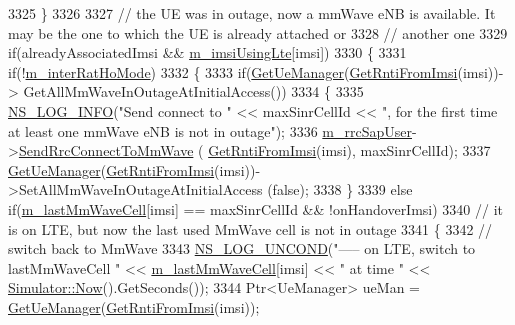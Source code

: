 \begin{DoxyCode}
3325   \}
3326 
3327   \textcolor{comment}{// the UE was in outage, now a mmWave eNB is available. It may be the one to which the UE is already
       attached or}
3328   \textcolor{comment}{// another one}
3329   \textcolor{keywordflow}{if}(alreadyAssociatedImsi && \hyperlink{classns3_1_1LteEnbRrc_a99427e888b10d095491e72bf062511db}{m\_imsiUsingLte}[imsi])
3330   \{
3331     \textcolor{keywordflow}{if}(!\hyperlink{classns3_1_1LteEnbRrc_a25849018e31a7766dfc839663e4c5ca4}{m\_interRatHoMode})
3332     \{
3333       \textcolor{keywordflow}{if}(\hyperlink{classns3_1_1LteEnbRrc_a875653948b565dc50b33f6a0434e32d9}{GetUeManager}(\hyperlink{classns3_1_1LteEnbRrc_a98f4b8f727e844ab621e447b7178ddc2}{GetRntiFromImsi}(imsi))->
      GetAllMmWaveInOutageAtInitialAccess())
3334       \{
3335         \hyperlink{group__logging_gafbd73ee2cf9f26b319f49086d8e860fb}{NS\_LOG\_INFO}(\textcolor{stringliteral}{"Send connect to "} << maxSinrCellId << \textcolor{stringliteral}{", for the first time at least one
       mmWave eNB is not in outage"});
3336         \hyperlink{classns3_1_1LteEnbRrc_a7bbf35518d70915fcd24d68a835fe6af}{m\_rrcSapUser}->\hyperlink{classns3_1_1LteEnbRrcSapUser_aee87f06442e7688b7d81fab229857ed4}{SendRrcConnectToMmWave} (
      \hyperlink{classns3_1_1LteEnbRrc_a98f4b8f727e844ab621e447b7178ddc2}{GetRntiFromImsi}(imsi), maxSinrCellId);
3337         \hyperlink{classns3_1_1LteEnbRrc_a875653948b565dc50b33f6a0434e32d9}{GetUeManager}(\hyperlink{classns3_1_1LteEnbRrc_a98f4b8f727e844ab621e447b7178ddc2}{GetRntiFromImsi}(imsi))->SetAllMmWaveInOutageAtInitialAccess
      (\textcolor{keyword}{false});
3338       \}
3339       \textcolor{keywordflow}{else} \textcolor{keywordflow}{if}(\hyperlink{classns3_1_1LteEnbRrc_a0d7b04f0383b0dc3f6a7360b87cbaeee}{m\_lastMmWaveCell}[imsi] == maxSinrCellId && !onHandoverImsi) 
3340       \textcolor{comment}{// it is on LTE, but now the last used MmWave cell is not in outage}
3341       \{
3342         \textcolor{comment}{// switch back to MmWave}
3343         \hyperlink{log-macros-disabled_8h_a0b36e5e182b37194f85ef1c5e979fb2e}{NS\_LOG\_UNCOND}(\textcolor{stringliteral}{"----- on LTE, switch to lastMmWaveCell "} << 
      \hyperlink{classns3_1_1LteEnbRrc_a0d7b04f0383b0dc3f6a7360b87cbaeee}{m\_lastMmWaveCell}[imsi] << \textcolor{stringliteral}{" at time "} << \hyperlink{classns3_1_1Simulator_ac3178fa975b419f7875e7105be122800}{Simulator::Now}().GetSeconds());
3344         Ptr<UeManager> ueMan = \hyperlink{classns3_1_1LteEnbRrc_a875653948b565dc50b33f6a0434e32d9}{GetUeManager}(\hyperlink{classns3_1_1LteEnbRrc_a98f4b8f727e844ab621e447b7178ddc2}{GetRntiFromImsi}(imsi));

\end{DoxyCode}
